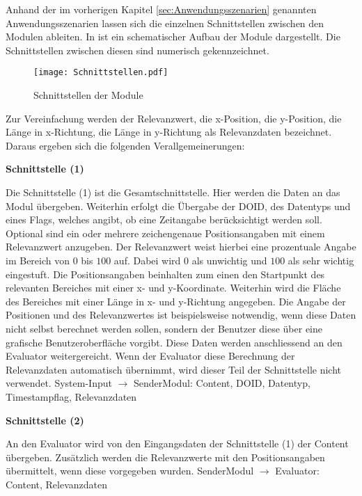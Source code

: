 Anhand der im vorherigen Kapitel \ref{sec:Anwendungsszenarien} genannten
Anwendungsszenarien lassen sich die einzelnen Schnittstellen zwischen den
Modulen ableiten. In  ist ein schematischer Aufbau
der Module dargestellt. Die Schnittstellen zwischen diesen sind numerisch
gekennzeichnet.

\begin{figure}[H]
\centering
\texttt{[image: Schnittstellen.pdf]}
\caption{Schnittstellen der Module}
\label{fig:Schnittstellen}
\end{figure}

Zur Vereinfachung werden der Relevanzwert, die x-Position, die
y-Position, die Länge in x-Richtung, die Länge in y-Richtung als Relevanzdaten
bezeichnet. Daraus ergeben sich die folgenden Verallgemeinerungen:

\textbf{Schnittstelle (1)}

Die Schnittstelle (1) ist die Gesamtschnittstelle. Hier werden die
Daten an das Modul übergeben. Weiterhin erfolgt die Übergabe der \gls{DOID}, des
Datentyps und eines Flags, welches angibt, ob eine Zeitangabe berücksichtigt
werden soll.
Optional sind ein oder mehrere zeichengenaue Positionsangaben mit einem
Relevanzwert anzugeben. Der Relevanzwert weist hierbei eine prozentuale Angabe
im Bereich von $0$ bis $100$ auf. Dabei wird $0$ als unwichtig und $100$ als
sehr wichtig eingestuft. Die Positionsangaben beinhalten zum einen den
Startpunkt des relevanten Bereiches mit einer x- und y-Koordinate. Weiterhin
wird die Fläche des Bereiches mit einer Länge in x- und y-Richtung angegeben.
Die Angabe der Positionen und des Relevanzwertes ist beispielsweise notwendig,
wenn diese Daten nicht selbst berechnet werden sollen, sondern der Benutzer
diese über eine grafische Benutzeroberfläche vorgibt. Diese Daten werden
anschliessend an den Evaluator weitergereicht. Wenn der Evaluator diese
Berechnung der Relevanzdaten automatisch übernimmt, wird dieser Teil der
Schnittstelle nicht verwendet.
\newline 
System-Input $\rightarrow$ SenderModul: Content, \gls{DOID}, Datentyp,
Timestampflag, Relevanzdaten

\textbf{Schnittstelle (2)}

An den Evaluator wird von den Eingangsdaten der Schnittstelle (1)
der Content übergeben. Zusätzlich werden die Relevanzwerte mit den
Positionsangaben übermittelt, wenn diese vorgegeben wurden.\newline
SenderModul $\rightarrow$ Evaluator: Content, Relevanzdaten  

